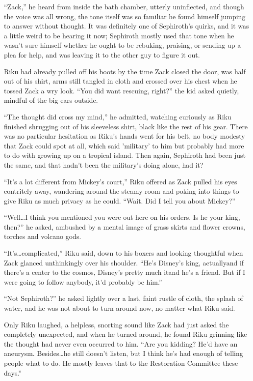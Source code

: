 ``Zack,'' he heard from inside the bath chamber, utterly uninflected, and though the voice was all wrong, the tone itself was so familiar he found himself jumping to answer without thought. It was definitely one of Sephiroth's quirks, and it was a little weird to be hearing it now; Sephiroth mostly used that tone when he wasn't sure himself whether he ought to be rebuking, praising, or sending up a plea for help, and was leaving it to the other guy to figure it out.

Riku had already pulled off his boots by the time Zack closed the door, was half out of his shirt, arms still tangled in cloth and crossed over his chest when he tossed Zack a wry look. ``You did want rescuing, right?'' the kid asked quietly, mindful of the big ears outside.

``The thought did cross my mind,'' he admitted, watching curiously as Riku finished shrugging out of his sleeveless shirt, black like the rest of his gear. There was no particular hesitation as Riku's hands went for his belt, no body modesty that Zack could spot at all, which said 'military' to him but probably had more to do with growing up on a tropical island. Then again, Sephiroth had been just the same, and that hadn't been the military's doing alone, had it?

``It's a lot different from Mickey's court,'' Riku offered as Zack pulled his eyes contritely away, wandering around the steamy room and poking into things to give Riku as much privacy as he could. ``Wait. Did I tell you about Mickey?''

``Well\ldots I think you mentioned you were out here on his orders. Is he your king, then?'' he asked, ambushed by a mental image of grass skirts and flower crowns, torches and volcano gods.

``It's\ldots complicated,'' Riku said, down to his boxers and looking thoughtful when Zack glanced unthinkingly over his shoulder. ``He's Disney's king, actually\textemdash and if there's a center to the cosmos, Disney's pretty much it\textemdash and he's a friend. But if I were going to follow anybody, it'd probably be him.''

``Not Sephiroth?'' he asked lightly over a last, faint rustle of cloth, the splash of water, and he was not about to turn around now, no matter what Riku said.

Only Riku laughed, a helpless, snorting sound like Zack had just asked the completely unexpected, and when he turned around, he found Riku grinning like the thought had never even occurred to him. ``Are you kidding? He'd have an aneurysm. Besides\ldots he still doesn't listen, but I think he's had enough of telling people what to do. He mostly leaves that to the Restoration Committee these days.''

